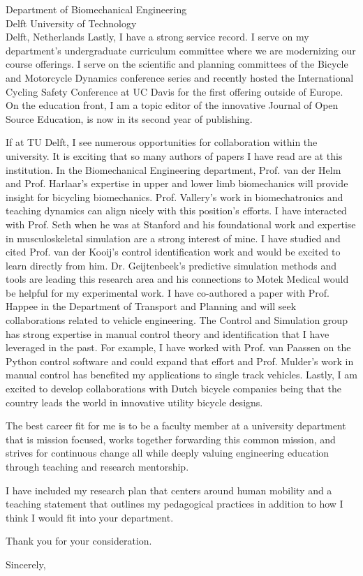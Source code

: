 \documentclass{letter}
\begin{document}
\begin{letter}{
  Department of Biomechanical Engineering \\
  Delft University of Technology \\
  Delft, Netherlands
}
Lastly, I have a strong service record. I serve on my department's
undergraduate curriculum committee where we are modernizing our course
offerings. I serve on the scientific and planning committees of the Bicycle and
Motorcycle Dynamics conference series and recently hosted the International
Cycling Safety Conference at UC Davis for the first offering outside of Europe.
On the education front, I am a topic editor of the innovative Journal of Open
Source Education, is now in its second year of publishing.

If at TU Delft, I see numerous opportunities for collaboration within the
university. It is exciting that so many authors of papers I have read are at
this institution. In the Biomechanical Engineering department, Prof.  van der
Helm and Prof. Harlaar's expertise in upper and lower limb biomechanics will
provide insight for bicycling biomechanics. Prof. Vallery's work in
biomechatronics and teaching dynamics can align nicely with this position's
efforts. I have interacted with Prof. Seth when he was at Stanford and his
foundational work and expertise in musculoskeletal simulation are a strong
interest of mine. I have studied and cited Prof. van der Kooij's control
identification work and would be excited to learn directly from him.  Dr.
Geijtenbeek's predictive simulation methods and tools are leading this research
area and  his connections to Motek Medical would be helpful for my experimental
work. I have co-authored a paper with Prof. Happee in the Department of
Transport and Planning and will seek collaborations related to vehicle
engineering. The Control and Simulation group has strong expertise in manual
control theory and identification that I have leveraged in the past. For
example, I have worked with Prof. van Paassen on the Python control software
and could expand that effort and Prof. Mulder's work in manual control has
benefited my applications to single track vehicles. Lastly, I am excited to
develop collaborations with Dutch bicycle companies being that the country
leads the world in innovative utility bicycle designs.

The best career fit for me is to be a faculty member at a university department
that is mission focused, works together forwarding this common mission, and
strives for continuous change all while deeply valuing engineering education
through teaching and research mentorship.


I have included my research plan that centers around human mobility and a
teaching statement that outlines my pedagogical practices in addition to how I
think I would fit into your department.

Thank you for your consideration.

\closing{Sincerely,}

\end{letter}
\end{document}
